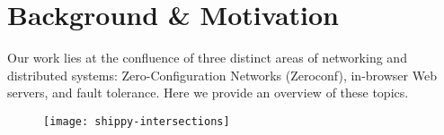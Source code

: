 \section{Background \& Motivation}
\label{sec:background}

Our work lies at the confluence of three distinct areas of networking and distributed systems: Zero-Configuration Networks (Zeroconf), in-browser Web servers, and fault tolerance.
Here we provide an overview of these topics.

\begin{figure}[h]
      \centering
      \texttt{[image: shippy-intersections]}
      \label{fig:stack}
\end{figure}







